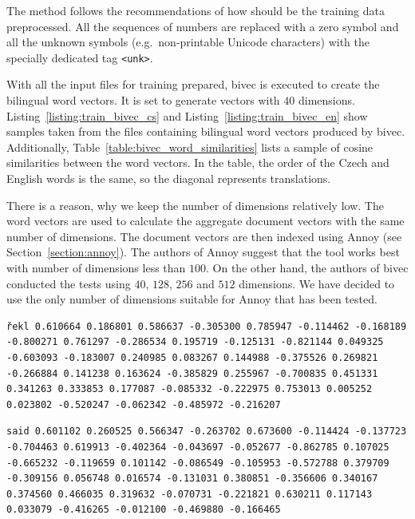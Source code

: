The method follows the recommendations of how should be the training data preprocessed. All the sequences of numbers are replaced with a zero symbol and all the unknown symbols (e.g.\ non-printable Unicode characters) with the specially dedicated tag \texttt{<unk>}.

With all the input files for training prepared, bivec is executed to create the bilingual word vectors. It is set to generate vectors with $40$ dimensions. Listing~\ref{listing:train_bivec_cs} and Listing~\ref{listing:train_bivec_en} show samples taken from the files containing bilingual word vectors produced by bivec. Additionally, Table~\ref{table:bivec_word_similarities} lists a sample of cosine similarities between the word vectors. In the table, the order of the Czech and English words is the same, so the diagonal represents translations.

There is a reason, why we keep the number of dimensions relatively low. The word vectors are used to calculate the aggregate document vectors with the same number of dimensions. The document vectors are then indexed using Annoy (see Section~\ref{section:annoy}). The authors of Annoy suggest that the tool works best with number of dimensions less than $100$. On the other hand, the authors of bivec conducted the tests using $40$, $128$, $256$ and $512$ dimensions. We have decided to use the only number of dimensions suitable for Annoy that has been tested.

\begin{lstlisting}[float=!htb,caption={Sample from a file with Czech word vectors (training)},label={listing:train_bivec_cs},firstnumber=89]
řekl 0.610664 0.186801 0.586637 -0.305300 0.785947 -0.114462 -0.168189 -0.800271 0.761297 -0.286534 0.195719 -0.125131 -0.821144 0.049325 -0.603093 -0.183007 0.240985 0.083267 0.144988 -0.375526 0.269821 -0.266884 0.141238 0.163624 -0.385829 0.255967 -0.700835 0.451331 0.341263 0.333853 0.177087 -0.085332 -0.222975 0.753013 0.005252 0.023802 -0.520247 -0.062342 -0.485972 -0.216207
\end{lstlisting}

\begin{lstlisting}[float=!htb,caption={Sample from a file with English word vectors (training)},label={listing:train_bivec_en},firstnumber=64]
said 0.601102 0.260525 0.566347 -0.263702 0.673600 -0.114424 -0.137723 -0.704463 0.619913 -0.402364 -0.043697 -0.052677 -0.862785 0.107025 -0.665232 -0.119659 0.101142 -0.086549 -0.105953 -0.572788 0.379709 -0.309156 0.056748 0.016574 -0.131031 0.380851 -0.356606 0.340167 0.374560 0.466035 0.319632 -0.070731 -0.221821 0.630211 0.117143 0.033079 -0.416265 -0.012100 -0.469880 -0.166465
\end{lstlisting}

